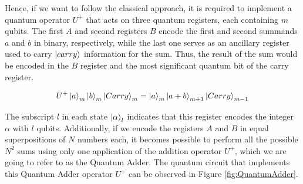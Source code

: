 \documentclass[aps,prapplied,longbibliography]{article}
\begin{document}
    Hence, if we want to follow the classical approach, it is required to implement a quantum operator $U^+$ that acts on three quantum registers, each containing $m$ qubits. The first $A$ and second registers $B$ encode the first and second summands $a$ and $b$ in binary, respectively, while the last one serves as an ancillary register used to carry $\ket{carry}$ information for the sum. Thus, the result of the sum would be encoded in the $B$ register and the most significant quantum bit of the carry register.

    \begin{equation}
        U^+\ket{a}_m\ket{b}_m\ket{Carry}_m = \ket{a}_m\ket{a+ b}_{m+1}\ket{Carry}_{m-1}
    \end{equation}

    The subscript $l$ in each state $\ket{\alpha}_l$ indicates that this register encodes the integer $\alpha$ with $l$ qubits. Additionally, if we encode the registers $A$ and $B$ in equal superpositions of $N$ numbers each, it becomes possible to perform all the possible $N^2$ sums using only one application of the addition operator $U^+$, which we are going to refer to as the Quantum Adder. The quantum circuit that implements this Quantum Adder operator $U^+$ can be observed in Figure \ref{fig:QuantumAdder}.
\end{document}
